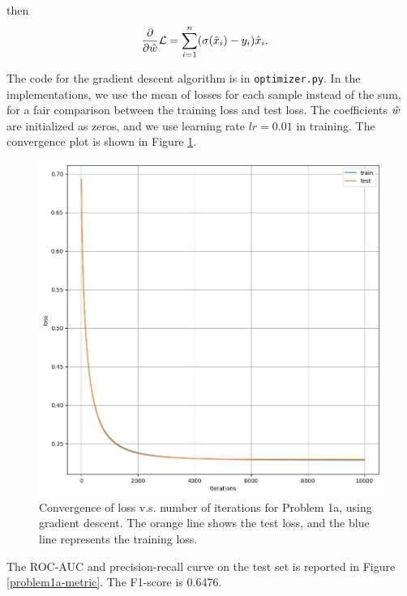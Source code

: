 \documentclass{article}%
\begin{document}
\begin{enumerate}
then
\begin{equation}
\begin{aligned}
\frac{\partial}{\partial \hat{w}}\mathcal{L} &= \sum_{i=1}^{n}(\sigma(\hat{x}_i)-y_i)\hat{x}_i.
\end{aligned}
\end{equation}

The code for the gradient descent algorithm is in \texttt{optimizer.py}. In the implementations, we use the mean of losses for each sample instead of the sum, for a fair comparison between the training loss and test loss. The coefficients $\hat{w}$ are initialized as zeros, and we use learning rate $lr = 0.01$ in training. The convergence plot is shown in Figure \ref{problem1a-convergence}.

\begin{figure}[htbp]
\centering
\includegraphics[scale=0.4]{problem1a.png}
\caption{Convergence of loss v.s. number of iterations for Problem 1a, using gradient descent. The orange line shows the test loss, and the blue line represents the training loss.}
\label{problem1a-convergence}
\end{figure}

The ROC-AUC and precision-recall curve on the test set is reported in Figure \ref{problem1a-metric}. The F1-score is 0.6476.


\end{enumerate}
\end{document}
